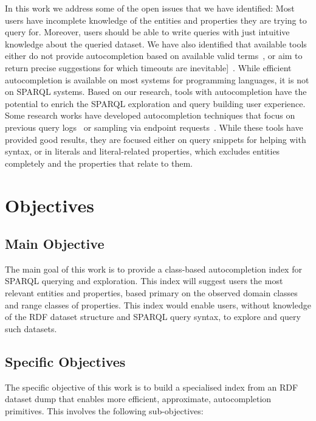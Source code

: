 In this work we address some of the open issues that we have identified: 
Most users have incomplete knowledge of the entities and properties they are trying to query for.
Moreover, users should be able to write queries with just intuitive knowledge about the queried dataset. 
We have also identified that available tools either do not provide autocompletion based on available valid terms~\cite{wikidataQueryService}, or aim to return precise suggestions for which timeouts are inevitable]~\cite{Vargas2019}. 
While efficient autocompletion is available on most systems for programming languages, it is not on SPARQL systems. 
Based on our research, tools with autocompletion have the potential to enrich the SPARQL exploration and query building user experience. 
Some research works have developed autocompletion techniques that focus on previous query logs~\cite{Rafes2018} or sampling via endpoint requests~\cite{El-Roby2016}. 
While these tools have provided good results, they are focused either on query snippets for helping with syntax, or in literals and literal-related properties, which excludes entities completely and the properties that relate to them. 

\section{Objectives}

\subsection{Main Objective}
The main goal of this work is to provide a class-based autocompletion index for SPARQL querying and exploration. 
This index will suggest users the most relevant entities and properties, based primary on the observed domain classes and range classes of properties.
This index would enable users, without knowledge of the RDF dataset structure and SPARQL query syntax, to explore and query such datasets.

\subsection{Specific Objectives}

The specific objective of this work is to build a specialised index from an RDF dataset dump that enables more efficient, approximate, autocompletion primitives. This involves the following sub-objectives:

